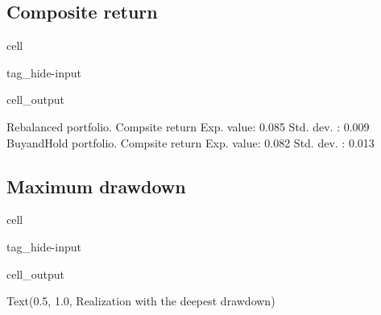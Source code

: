 \documentclass[letterpaper,10pt,english]{jupyterBook}
\begin{document}
\subsection{Composite return}
\label{\detokenize{code/notebooks/rebalancing:composite-return}}
\begin{sphinxuseclass}{cell}
\begin{sphinxuseclass}{tag_hide-input}\begin{sphinxVerbatimOutput}

\begin{sphinxuseclass}{cell_output}
\begin{sphinxVerbatim}[commandchars=\\\{\}]
Rebalanced portfolio. Compsite return
 Exp. value: 0.085
 Std. dev. : 0.009
Buy\PYGZhy{}and\PYGZhy{}Hold portfolio. Compsite return
 Exp. value: 0.082
 Std. dev. : 0.013
\end{sphinxVerbatim}

\noindent{}

\end{sphinxuseclass}\end{sphinxVerbatimOutput}

\end{sphinxuseclass}
\end{sphinxuseclass}

\subsection{Maximum drawdown}
\label{\detokenize{code/notebooks/rebalancing:maximum-drawdown}}
\begin{sphinxuseclass}{cell}
\begin{sphinxuseclass}{tag_hide-input}\begin{sphinxVerbatimOutput}

\begin{sphinxuseclass}{cell_output}
\begin{sphinxVerbatim}[commandchars=\\\{\}]
Text(0.5, 1.0, \PYGZsq{}Realization with the deepest drawdown\PYGZsq{})
\end{sphinxVerbatim}

\noindent{}

\end{sphinxuseclass}\end{sphinxVerbatimOutput}

\end{sphinxuseclass}
\end{sphinxuseclass}
\sphinxstepscope
\end{document}

